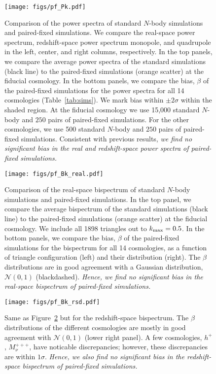 \begin{figure}
\begin{center}
    \texttt{[image: figs/pf\_Pk.pdf]} 
    \caption{Comparison of the power spectra of standard $N$-body simulations 
    and paired-fixed simulations. We compare the real-space power spectrum, 
    redshift-space power spectrum monopole, and quadrupole in the left, center, 
    and right columns, respectively. In the top panels, we compare the average 
    power spectra of the standard simulations (black line) to the paired-fixed
    simulations (orange scatter) at the fiducial cosmology. In the bottom panels, 
    we compare the bias, $\beta$ of the paired-fixed simulations for the power 
    spectra for all 14 cosmologies (Table~\ref{tab:sims}). We mark bias within 
    $\pm2\sigma$ within the shaded region. At the fiducial 
    cosmology we use 15,000 standard $N$-body and $250$ pairs of paired-fixed 
    simulations. For the other cosmologies, we use 500 standard $N$-body and $250$ pairs 
    of paired-fixed simulations. Consistent with previous results, {\em we find no
    significant bias in the real and redshift-space power spectra of paired-fixed
    simulations.}
    }
\label{fig:pk}
\end{center}
\end{figure}


\begin{figure}
\begin{center}
    \texttt{[image: figs/pf\_Bk\_real.pdf]} 
    \caption{Comparison of the real-space bispectrum of standard $N$-body simulations 
    and paired-fixed simulations. In the top panel, we compare the average 
    bispectrum of the standard simulations (black line) to the paired-fixed
    simulations (orange scatter) at the fiducial cosmology. We include all 
    1898 triangles out to $k_{\rm max} = 0.5$. In the bottom panels, we 
    compare the bias, $\beta$ of the paired-fixed simulations for the bispectrum 
    for all 14 cosmologies, as a function of triangle configuration (left) 
    and their distribution (right). The $\beta$ distributions are in good 
    agreement with a Gaussian distribution, $\mathcal{N}(0,1)$ (blackdashed). 
    {\em Hence, we find no significant bias in the real-space bispectrum of 
    paired-fixed simulations.}
}
\label{fig:bk_real}
\end{center}
\end{figure}

\begin{figure}
\begin{center}
    \texttt{[image: figs/pf\_Bk\_rsd.pdf]} 
    \caption{Same as Figure~\ref{fig:bk_real} but for the redshift-space bispectrum.
    The $\beta$ distributions of the different cosmologies are mostly in good 
    agreement with $\mathcal{N}(0,1)$ (lower right panel). A few cosmologies, 
    $h^+$, $M_\nu^{+++}$, have noticable discrepancies; however, these 
    discrepancies are within $1\sigma$. {\em Hence, we also find no significant 
    bias in the redshift-space bispectrum of paired-fixed simulations.}
    }
\label{fig:bk_rsd}
\end{center}
\end{figure}

